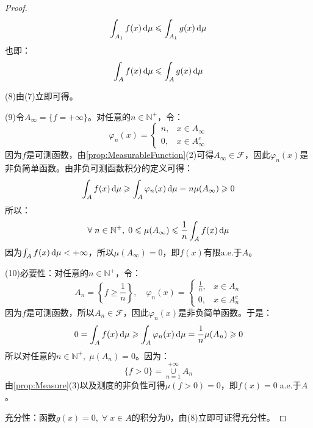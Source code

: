 \begin{proof}
	\begin{equation*}
		\int_{A_1}f(x)\mathop{}\!\mathrm{d}\mu\leqslant\int_{A_1}g(x)\mathop{}\!\mathrm{d}\mu
	\end{equation*}
	也即：
	\begin{equation*}
		\int_{A}f(x)\mathop{}\!\mathrm{d}\mu\leqslant\int_{A}g(x)\mathop{}\!\mathrm{d}\mu
	\end{equation*}\par
	(8)由(7)立即可得。\par
	(9)令$A_\infty=\{f=+\infty\}$。对任意的$n\in\mathbb{N}^+$，令：
	\begin{equation*}
		\varphi_n(x)=
		\begin{cases}
			n,&x\in A_\infty \\
			0,&x\in A_\infty^c
		\end{cases}
	\end{equation*}
	因为$f$是可测函数，由\cref{prop:MeasurableFunction}(2)可得$A_\infty\in\mathscr{F}$，因此$\varphi_n(x)$是非负简单函数。由非负可测函数积分的定义可得：
	\begin{equation*}
		\int_{A}f(x)\mathop{}\!\mathrm{d}\mu\geqslant\int_{A}\varphi_n(x)\mathop{}\!\mathrm{d}\mu=n\mu(A_\infty)\geqslant0
	\end{equation*}
	所以：
	\begin{equation*}
		\forall\;n\in\mathbb{N}^+,\;0\leqslant \mu(A_\infty)\leqslant\frac{1}{n}\int_{A}f(x)\mathop{}\!\mathrm{d}\mu
	\end{equation*}
	因为$\int_{A}f(x)\mathop{}\!\mathrm{d}\mu<+\infty$，所以$\mu(A_\infty)=0$，即$f(x)$有限a.e.于$A$。\par
	(10)必要性：对任意的$n\in\mathbb{N}^+$，令：
	\begin{equation*}
		A_n=\left\{f\geqslant\frac{1}{n}\right\},\quad
		\varphi_n(x)=
		\begin{cases}
			\frac{1}{n},&x\in A_n \\
			0,&x\in A_n^c
		\end{cases}
	\end{equation*}
	因为$f$是可测函数，所以$A_n\in \mathscr{F}$，因此$\varphi_n(x)$是非负简单函数。于是：
	\begin{equation*}
		0=\int_{A}f(x)\mathop{}\!\mathrm{d}\mu\geqslant\int_{A}\varphi_n(x)\mathop{}\!\mathrm{d}\mu=\frac{1}{n}\mu(A_n)\geqslant0
	\end{equation*}
	所以对任意的$n\in\mathbb{N}^+,\;\mu(A_n)=0$。因为：
	\begin{equation*}
		\{f>0\}=\underset{n=1}{\overset{+\infty}{\cup}}A_n
	\end{equation*}
	由\cref{prop:Measure}(3)以及测度的非负性可得$\mu(f>0)=0$，即$f(x)=0\;$a.e.于$A$。\par
	充分性：函数$g(x)=0,\;\forall\;x\in A$的积分为$0$，由(8)立即可证得充分性。
\end{proof}

